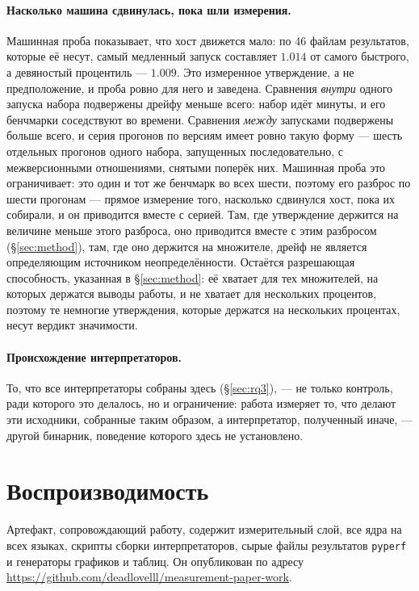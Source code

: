 \documentclass[10pt,a4paper]{article}
\newcommand{\code}[1]{\texttt{\small #1}}
\begin{document}
\paragraph{Насколько машина сдвинулась, пока шли измерения.} Машинная проба показывает, что
хост движется мало: по 46 файлам результатов, которые её несут, самый медленный запуск составляет
$1.014$ от самого быстрого, а девяностый процентиль --- $1.009$. Это измеренное утверждение, а не
предположение, и проба ровно для него и заведена. Сравнения \emph{внутри} одного запуска набора
подвержены дрейфу меньше всего: набор идёт минуты, и его бенчмарки соседствуют во времени.
Сравнения \emph{между} запусками подвержены больше всего, и серия прогонов по версиям имеет ровно такую
форму --- шесть отдельных прогонов одного набора, запущенных последовательно, с межверсионными
отношениями, снятыми поперёк них. Машинная проба это ограничивает: это один и тот же бенчмарк во
всех шести, поэтому его разброс по шести прогонам --- прямое измерение того, насколько сдвинулся
хост, пока их собирали, и он приводится вместе с серией. Там, где утверждение держится на
величине меньше этого разброса, оно приводится вместе с этим разбросом (\S\ref{sec:method}), там, где оно
держится на множителе, дрейф не является определяющим источником неопределённости. Остаётся разрешающая
способность, указанная в \S\ref{sec:method}: её хватает для тех множителей, на которых держатся
выводы работы, и не хватает для нескольких процентов, поэтому те немногие
утверждения, которые держатся на нескольких процентах, несут вердикт значимости.

\paragraph{Происхождение интерпретаторов.} То, что все интерпретаторы собраны здесь
(\S\ref{sec:rq3}), --- не только контроль, ради которого это делалось, но и ограничение: работа
измеряет то, что делают эти исходники, собранные таким образом, а интерпретатор, полученный
иначе, --- другой бинарник, поведение которого здесь не установлено.

\section{Воспроизводимость}
\label{sec:repro}

Артефакт, сопровождающий работу, содержит измерительный слой, все ядра на всех языках, скрипты
сборки интерпретаторов, сырые файлы результатов \code{pyperf} и генераторы
графиков и таблиц. Он опубликован по адресу
\url{https://github.com/deadlovelll/measurement-paper-work}.
\end{document}
